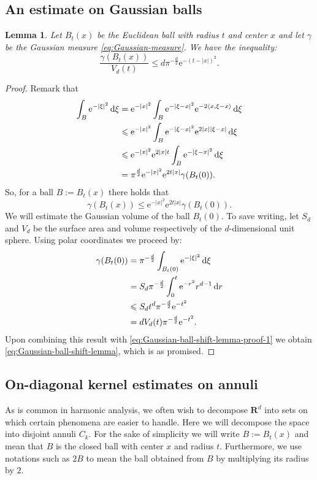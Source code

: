 \documentclass[a4paper,oneside,10pt]{amsproc}
\newtheorem{lemma}{Lemma}
\theoremstyle{remark}
\newcommand{\D}{\,\textup{d}}
\newcommand{\la}{\langle}
\newcommand{\ra}{\rangle}
\renewcommand{\leq}{\leqslant}
\renewcommand{\leq}{\leqslant}
\newcommand{\R}{\mathbf R}
\newcommand{\e}{\mathrm{e}} %
\renewcommand{\leq}{\leqslant}%
\begin{document}
\subsection{An estimate on Gaussian balls}
\begin{lemma}\label{lem:Gaussian-ball-shift-lemma}
  Let $B_t(x)$ be the Euclidean ball with radius $t$ and center $x$
  and let $\gamma$ be the Gaussian measure
  \eqref{eq:Gaussian-measure}. We have the inequality:
  \begin{equation}\label{eq:Gaussian-ball-shift-lemma}
    \frac{\gamma(B_t(x))}{V_d(t)} \leq d \pi^{-\frac{d}2} \e^{-(t -
      |x|)^2}.
  \end{equation}
\end{lemma}
\begin{proof}
  Remark that
  \begin{align*}
    \int_B \e^{-|\xi|^2} \D\xi &= \e^{-|x|^2} \int_{B} \e^{-|\xi -
      x|^2} \e^{-2 \la x, \xi - x \ra} \D\xi\\
    &\leq \e^{-|x|^2} \int_{B} \e^{-|\xi - x|^2} \e^{2 |x| |\xi - x|}
    \D\xi\\
    &\leq \e^{-|x|^2} \e^{2 |x| t} \int_{B} \e^{-|\xi - x|^2} \D\xi\\
    &= \pi^{\frac{d}2} \e^{-|x|^2} \e^{2 t |x|} \gamma(B_t(0)).
  \end{align*}
  So, for a ball $B:= B_t(x)$ there holds that
  \begin{equation}\label{eq:Gaussian-ball-shift-lemma-proof-1}
    \gamma(B_t(x)) \leq \e^{-|x|^2} \e^{2 t |x|} \gamma(B_t(0)).
  \end{equation}
  We will estimate the Gaussian volume of the ball $B_t(0)$. To save
  writing, let $S_d$ and $V_d$ be the surface area and volume
  respectively of the $d$-dimensional unit sphere. Using polar coordinates
  we proceed by: 
  \begin{align*}
    \gamma(B_t(0)) &= \pi^{-\frac{d}2} \int_{B_t(0)} \e^{-|\xi|^2} \D\xi\\
    &= S_d \pi^{-\frac{d}2} \int_0^t \e^{-r^2} r^{d - 1} \D{r}\\
    &\leq S_d t^d \pi^{-\frac{d}2}\e^{-t^2}\\
    &= d V_d(t) \pi^{-\frac{d}2}\e^{-t^2}.
  \end{align*}
  Upon combining this result with
  \eqref{eq:Gaussian-ball-shift-lemma-proof-1} we obtain
  \eqref{eq:Gaussian-ball-shift-lemma}, which is as promised.
\end{proof}

\subsection{On-diagonal kernel estimates on annuli}
As is common in harmonic analysis, we often wish to decompose
$\R^d$ into sets on which certain phenomena are easier to handle. Here
we will decompose the space into disjoint annuli $C_k$. For the sake
of simplicity we will write $B := B_t(x)$ and mean that $B$ is the
closed ball with center $x$ and radius $t$. Furthermore, we use
notations such as $2B$ to mean the ball obtained from $B$ by
multiplying its radius by $2$.
\end{document}
